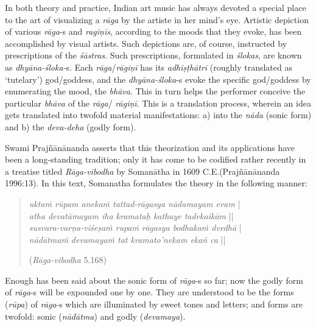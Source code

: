 In both theory and practice, Indian art music has always devoted a special place to the art of visualizing a \textsl{rāga} by the artiste in her mind’s eye. Artistic depiction of various \textsl{rāga}-s and \textsl{ragiṇīs}, according to the moods that they evoke, has been accomplished by visual artists. Such depictions are, of course, instructed by prescriptions of the \textsl{śāstras}. Such prescriptions, formulated in \textsl{ślokas}, are known as \textsl{dhyāna-śloka-}s. Each \textsl{rāga}/\textsl{rāgiṇī} has its \textsl{adhiṣṭhātrī} (roughly translated as ‘tutelary’) god/goddess, and the \textsl{dhyāna-śloka}-s evoke the specific god/goddess by enumerating the mood, the \textsl{bhāva}. This in turn helps the performer conceive the particular \textsl{bhāva} of the \textsl{rāga}/ \textsl{rāgiṇī}. This is a translation process, wherein an idea gets translated into twofold material manifestations: a) into the \textsl{nāda} (sonic form) and b) the \textsl{deva-deha} (godly form).

Swami Prajñānānanda asserts that this theorization and its applications have been a long-standing tradition; only it has come to be codified rather recently in a treatise titled \textsl{Rāga-vibodha} by Somanātha in 1609 C.E.(Prajñānānanda 1996:13).  In this text, Somanatha formulates the theory in the following manner:
\begin{quote}
\textsl{uktaṁ rūpam anekaṁ tattad-rāgasya nādamayam evam} |\\
\textsl{atha devatāmayam iha kramataḥ kathaye tadekaikām} ||\\
\textsl{susvara-varṇa-viśeṣaṁ rupaṁ rāgasya bodhakaṁ dvedhā} |\\
\textsl{nādātmaṁ devamayaṁ tat kramato’nekam ekañ ca} || 

\hfill (\textsl{Rāga-vibodha} 5.168)
\end{quote}

Enough has been said about the sonic form of \textsl{rāga}-s so far; now the godly form of \textsl{rāga}-s will be expounded one by one. They are understood to be the forms (\textsl{rūpa}) of \hbox{\textsl{rāga}-s} which are illuminated by sweet tones and letters; and forms are twofold: sonic (\textsl{nādātma}) and godly (\textsl{devamaya}). 

